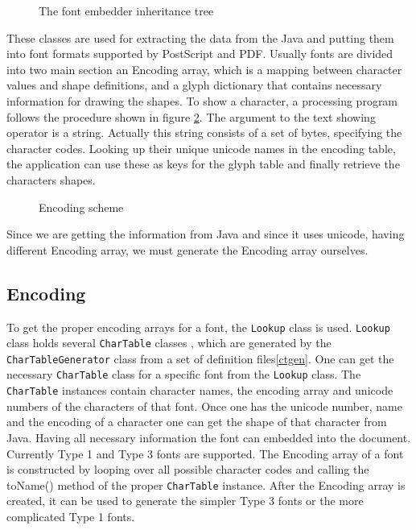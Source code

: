\documentclass[a4paper]{article}
\newcommand{\class}[1]{\texttt{#1}}
\newcommand{\fhclass}[1]{\class{#1}}
\newcommand{\method}[1]{\textsf{#1}}
\newcommand{\ps}{PostScript}
\newcommand{\pdf}{PDF}
\begin{document}
\begin{figure}[htbo]
\caption{The font embedder inheritance tree}
\label{fontclasses}
\end{figure}

These classes are used for extracting the data from the Java and
putting them into font formats supported by \ps{} and \pdf{}. Usually
fonts are divided into two main section an Encoding array, which is a
mapping between character values and shape definitions, and a glyph
dictionary that contains necessary information for drawing the
shapes. To show a character, a processing program follows the
procedure shown in figure \ref{encoding}. The argument to the text
showing operator is a string. Actually this string consists of a set
of bytes, specifying the character codes. Looking up their unique unicode
names in the encoding table, the application can use these as keys for
the glyph table and finally retrieve the characters shapes.

\begin{figure}[htbo]
\caption{Encoding scheme}
\label{encoding}
\end{figure}

Since we are getting the information from Java and since it uses
unicode, having different Encoding array, we must generate the
Encoding array ourselves.


\subsection{Encoding}

To get the proper encoding arrays for a font, the \fhclass{Lookup} class is
used. \fhclass{Lookup} class holds several \fhclass{CharTable} classes
, which are generated by the \fhclass{CharTableGenerator} class from a
set of definition files\ref{ctgen}. One can get the necessary
\fhclass{CharTable} class for a specific font from the
\fhclass{Lookup} class. The \fhclass{CharTable} instances contain
character names, the encoding array and unicode numbers of the characters
of that font. Once one has the unicode number, name and the encoding
of a character one can get the shape of that character from
Java. Having all necessary information the font can embedded into the
document. Currently Type 1
and Type 3 fonts are supported. The Encoding array of a font is
constructed by looping over all possible character codes and
calling the  \method{toName()} method of the proper
\fhclass{CharTable} instance. After the Encoding array is created, it can
be used to generate the simpler Type 3 fonts or the more complicated
Type 1 fonts.
\end{document}
